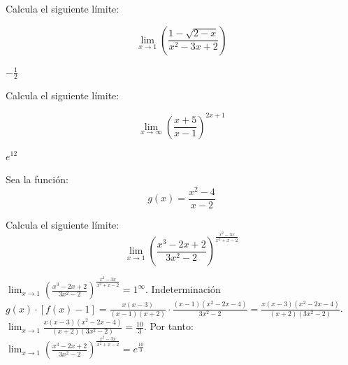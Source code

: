\documentclass[addpoints,spanish, 12pt,a4paper]{exam}
\begin{document}
\begin{questions}

%
%
%

\question[1] Calcula el siguiente límite:

$$\lim_{x \to 1}\left(\frac{1 - \sqrt{2 - x}}{x^{2} - 3 x + 2}\right)$$

\begin{solution}$- \frac{1}{2}$\end{solution}

\question[1] Calcula el siguiente límite:

$$\lim_{x \to \infty} \left(\frac{x + 5}{x - 1}\right)^{2 x + 1}$$

\begin{solution}$e^{12}$\end{solution}

\question Sea la función: $$g(x)=\dfrac{x^2-4}{x-2}$$
		



\question[6] Calcula el siguiente límite: $$\lim_{x \to 1} \left(\frac{x^{3} - 2 x + 2}{3 x^{2} - 2}\right)^{\frac{x^{2} - 3 x}{x^{2} + x - 2}}$$
\begin{solution}
$\lim_{x \to 1} \left(\frac{x^{3} - 2 x + 2}{3 x^{2} - 2}\right)^{\frac{x^{2} - 3 x}{x^{2} + x - 2}}=1^\infty$. Indeterminación \\ $g(x)\cdot\left[f(x)-1\right]=\frac{x \left(x - 3\right)}{\left(x - 1\right) \left(x + 2\right)}\cdot\frac{\left(x - 1\right) \left(x^{2} - 2 x - 4\right)}{3 x^{2} - 2}=\frac{x \left(x - 3\right) \left(x^{2} - 2 x - 4\right)}{\left(x + 2\right) \left(3 x^{2} - 2\right)}$. \\ $\lim_{x \to 1}\frac{x \left(x - 3\right) \left(x^{2} - 2 x - 4\right)}{\left(x + 2\right) \left(3 x^{2} - 2\right)}=\frac{10}{3}$. Por tanto: \\ $\lim_{x \to 1} \left(\frac{x^{3} - 2 x + 2}{3 x^{2} - 2}\right)^{\frac{x^{2} - 3 x}{x^{2} + x - 2}}=e^{\frac{10}{3}}$


\end{solution}
\end{questions}
\end{document}
